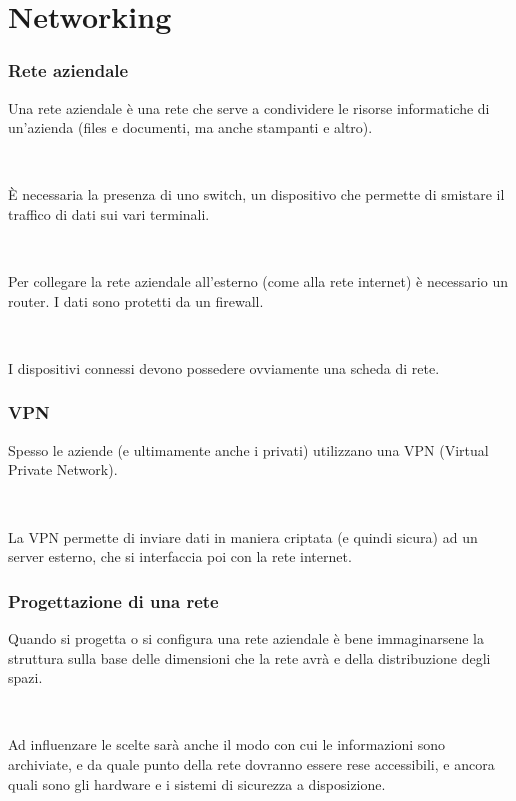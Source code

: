\documentclass[]{beamer}
\begin{document}
\section{Networking}

\begin{frame}
\frametitle{Rete aziendale}
Una rete aziendale è una rete che serve a condividere le risorse informatiche di un'azienda (files e documenti, ma anche stampanti e altro).\pause

~

È necessaria la presenza di uno \alert<2>{switch}, un dispositivo che permette di smistare il traffico di dati sui vari terminali.\pause

~

Per collegare la rete aziendale all'esterno (come alla rete internet) è necessario un \alert<3>{router}. I dati sono protetti da un \alert<3>{firewall}.\pause

~

I dispositivi connessi devono possedere ovviamente una \alert<4>{scheda di rete}.
\end{frame}

\begin{frame}
\frametitle{VPN}
Spesso le aziende (e ultimamente anche i privati) utilizzano una VPN (Virtual Private Network).\pause

~

La VPN permette di inviare dati in maniera criptata (e quindi sicura) ad un server esterno, che si interfaccia poi con la rete internet.

\end{frame}


\begin{frame}
\frametitle{Progettazione di una rete}
Quando si progetta o si configura una rete aziendale è bene immaginarsene la struttura sulla base delle \alert<1>{dimensioni} che la rete avrà e della distribuzione degli spazi.\pause

~

Ad influenzare le scelte sarà anche il modo con cui le informazioni sono archiviate, e da quale punto della rete dovranno essere rese accessibili, e ancora quali sono gli hardware e i sistemi di sicurezza a disposizione.
\end{frame}
\end{document}

